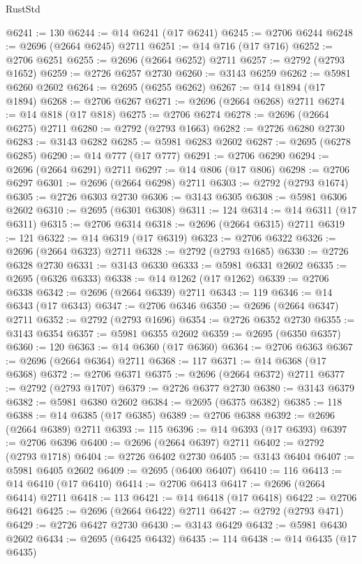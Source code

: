 \begin{lexlean}{RustStd}
\begin{coremodule}
@6241 := 130
@6244 := @14 @6241 (@17 @6241)
@6245 := @2706 @6244
@6248 := @2696 (@2664 @6245) @2711
@6251 := @14 @716 (@17 @716)
@6252 := @2706 @6251
@6255 := @2696 (@2664 @6252) @2711
@6257 := @2792 (@2793 @1652)
@6259 := @2726 @6257 @2730
@6260 := @3143 @6259
@6262 := @5981 @6260 @2602
@6264 := @2695 (@6255 @6262)
@6267 := @14 @1894 (@17 @1894)
@6268 := @2706 @6267
@6271 := @2696 (@2664 @6268) @2711
@6274 := @14 @818 (@17 @818)
@6275 := @2706 @6274
@6278 := @2696 (@2664 @6275) @2711
@6280 := @2792 (@2793 @1663)
@6282 := @2726 @6280 @2730
@6283 := @3143 @6282
@6285 := @5981 @6283 @2602
@6287 := @2695 (@6278 @6285)
@6290 := @14 @777 (@17 @777)
@6291 := @2706 @6290
@6294 := @2696 (@2664 @6291) @2711
@6297 := @14 @806 (@17 @806)
@6298 := @2706 @6297
@6301 := @2696 (@2664 @6298) @2711
@6303 := @2792 (@2793 @1674)
@6305 := @2726 @6303 @2730
@6306 := @3143 @6305
@6308 := @5981 @6306 @2602
@6310 := @2695 (@6301 @6308)
@6311 := 124
@6314 := @14 @6311 (@17 @6311)
@6315 := @2706 @6314
@6318 := @2696 (@2664 @6315) @2711
@6319 := 121
@6322 := @14 @6319 (@17 @6319)
@6323 := @2706 @6322
@6326 := @2696 (@2664 @6323) @2711
@6328 := @2792 (@2793 @1685)
@6330 := @2726 @6328 @2730
@6331 := @3143 @6330
@6333 := @5981 @6331 @2602
@6335 := @2695 (@6326 @6333)
@6338 := @14 @1262 (@17 @1262)
@6339 := @2706 @6338
@6342 := @2696 (@2664 @6339) @2711
@6343 := 119
@6346 := @14 @6343 (@17 @6343)
@6347 := @2706 @6346
@6350 := @2696 (@2664 @6347) @2711
@6352 := @2792 (@2793 @1696)
@6354 := @2726 @6352 @2730
@6355 := @3143 @6354
@6357 := @5981 @6355 @2602
@6359 := @2695 (@6350 @6357)
@6360 := 120
@6363 := @14 @6360 (@17 @6360)
@6364 := @2706 @6363
@6367 := @2696 (@2664 @6364) @2711
@6368 := 117
@6371 := @14 @6368 (@17 @6368)
@6372 := @2706 @6371
@6375 := @2696 (@2664 @6372) @2711
@6377 := @2792 (@2793 @1707)
@6379 := @2726 @6377 @2730
@6380 := @3143 @6379
@6382 := @5981 @6380 @2602
@6384 := @2695 (@6375 @6382)
@6385 := 118
@6388 := @14 @6385 (@17 @6385)
@6389 := @2706 @6388
@6392 := @2696 (@2664 @6389) @2711
@6393 := 115
@6396 := @14 @6393 (@17 @6393)
@6397 := @2706 @6396
@6400 := @2696 (@2664 @6397) @2711
@6402 := @2792 (@2793 @1718)
@6404 := @2726 @6402 @2730
@6405 := @3143 @6404
@6407 := @5981 @6405 @2602
@6409 := @2695 (@6400 @6407)
@6410 := 116
@6413 := @14 @6410 (@17 @6410)
@6414 := @2706 @6413
@6417 := @2696 (@2664 @6414) @2711
@6418 := 113
@6421 := @14 @6418 (@17 @6418)
@6422 := @2706 @6421
@6425 := @2696 (@2664 @6422) @2711
@6427 := @2792 (@2793 @471)
@6429 := @2726 @6427 @2730
@6430 := @3143 @6429
@6432 := @5981 @6430 @2602
@6434 := @2695 (@6425 @6432)
@6435 := 114
@6438 := @14 @6435 (@17 @6435)

\end{coremodule}
\end{lexlean}
